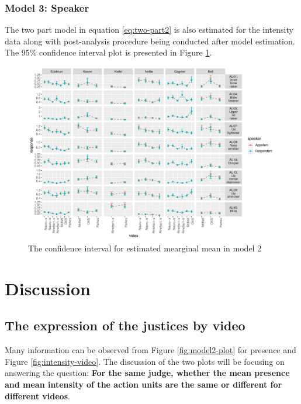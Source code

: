 \documentclass{monashthesis}
\begin{document}
\hypertarget{model-3-speaker-2}{%
\subsection{Model 3: Speaker}\label{model-3-speaker-2}}

The two part model in equation \ref{eq:two-part2} is also estimated for the intensity data along with post-analysis procedure being conducted after model estimation. The 95\% confidence interval plot is presented in Figure \ref{fig:intensity-speaker}.

\begin{figure}

{\centering \includegraphics[width=1\linewidth]{figures/intensity-speaker-1} 

}

\caption{The confidence interval for estimated mearginal mean in model 2}\label{fig:intensity-speaker}
\end{figure}

\hypertarget{discussion}{%
\chapter{Discussion}\label{discussion}}

\hypertarget{the-expression-of-the-justices-by-video}{%
\section{The expression of the justices by video}\label{the-expression-of-the-justices-by-video}}

Many information can be observed from Figure \ref{fig:model2-plot} for presence and Figure \ref{fig:intensity-video}. The discussion of the two plots will be focusing on answering the question: \textbf{For the same judge, whether the mean presence and mean intensity of the action units are the same or different for different videos}.
\end{document}
